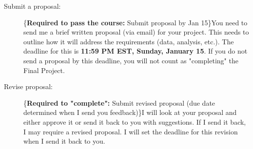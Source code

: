 \documentclass{tufte-handout}
\begin{document}
\begin{description}
\item[{Submit a proposal:}] \marginnote\{\textbf{Required to pass the course:} Submit proposal by Jan 15\}You need to send me a brief written proposal (via email) for your project. This needs to outline how it will address the requirements (data, analysis, etc.). The deadline for this is \textbf{11:59 PM EST, Sunday, January 15}. If you do not send a proposal by this deadline, you will not count as "completing" the Final Project.
\item[{Revise proposal:}] \marginnote\{\textbf{Required to "complete":} Submit revised proposal (due date determined when I send you feedback)\}I will look at your proposal and either approve it or send it back to you with suggestions. If I send it back, I may require a revised proposal. I will set the deadline for this revision when I send it back to you.
\end{description}
\newpage
\end{document}
